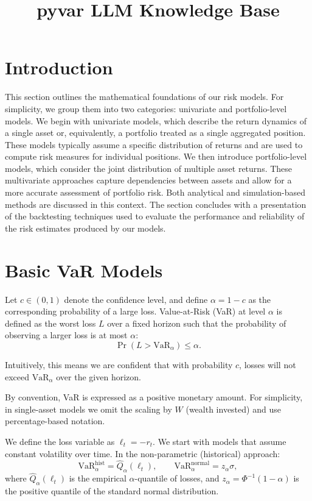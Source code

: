 \documentclass[12pt]{article}
\title{\textbf{pyvar LLM Knowledge Base}}
\author{}
\date{}
\begin{document}
\maketitle
\tableofcontents
\newpage

\section{Introduction}

This section outlines the mathematical foundations of our risk models. For simplicity, we group them into two categories: univariate and portfolio-level models. We begin with univariate models, which describe the return dynamics of a single asset or, equivalently, a portfolio treated as a single aggregated position. These models typically assume a specific distribution of returns and are used to compute risk measures for individual positions.
We then introduce portfolio-level models, which consider the joint distribution of multiple asset returns. These multivariate approaches capture dependencies between assets and allow for a more accurate assessment of portfolio risk. Both analytical and simulation-based methods are discussed in this context.
The section concludes with a presentation of the backtesting techniques used to evaluate the performance and reliability of the risk estimates produced by our models.


\section{Basic VaR Models}

Let \( c \in (0,1) \) denote the confidence level, and define \( \alpha = 1 - c \) as the corresponding probability of a large loss. Value-at-Risk (VaR) at level \( \alpha \) is defined as the worst loss \( L \) over a fixed horizon such that the probability of observing a larger loss is at most \( \alpha \):
\[
\Pr(L > \text{VaR}_\alpha) \le \alpha.
\]

Intuitively, this means we are confident that with probability \( c \), losses will not exceed \( \text{VaR}_\alpha \) over the given horizon.

By convention, VaR is expressed as a positive monetary amount. For simplicity, in single-asset models we omit the scaling by \( W \) (wealth invested) and use percentage-based notation.

We define the loss variable as \( \ell_t = -r_t \). We start with models that assume constant volatility over time. In the non-parametric (historical) approach:
\[
\mathrm{VaR}_{\alpha}^{\mathrm{hist}} = \widehat{Q}_{\alpha}(\ell_t), \qquad
\mathrm{VaR}_{\alpha}^{\mathrm{normal}} = z_{\alpha} \sigma,
\]
where \( \widehat{Q}_{\alpha}(\ell_t) \) is the empirical \(\alpha\)-quantile of losses, and \( z_\alpha = \Phi^{-1}(1 - \alpha) \) is the positive quantile of the standard normal distribution.
\end{document}
